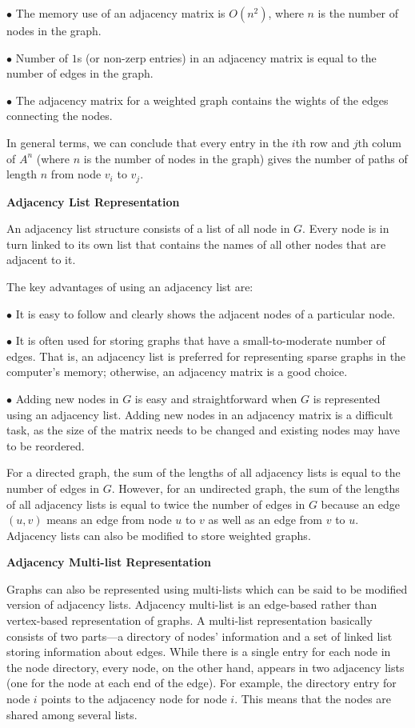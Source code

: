 \vskip 3mm
\qquad$\bullet$ The memory use of an adjacency matrix is $O(n^2)$, where $n$ is the number of nodes in the graph.

\vskip 3mm
\qquad$\bullet$ Number of $1$s (or non-zerp entries) in an adjacency matrix is equal to the number of edges in the graph.

\vskip 3mm
\qquad$\bullet$ The adjacency matrix for a weighted graph contains the wights of the edges connecting the nodes.

\vskip 1mm
In general terms, we can conclude that every entry in the $i$th row and $j$th colum of $A^n$ (where $n$ is the number of nodes in the graph) gives the number of paths of length $n$ from node $v_i$ to $v_j$.

\filbreak
\vskip 1cm
{\bf Adjacency List Representation}

\vskip 1mm
An adjacency list structure consists of a list of all node in $G$. Every node is in turn linked to its own list that contains the names of all other nodes that are adjacent to it.

\vskip 2mm
The key advantages of using an adjacency list are:

\vskip 3mm
\qquad$\bullet$ It is easy to follow and clearly shows the adjacent nodes of a particular node.

\vskip 3mm
\qquad$\bullet$ It is often used for storing graphs that have a small-to-moderate number of edges. That is, an adjacency list is preferred for representing sparse graphs in the computer's memory; otherwise, an adjacency matrix is a good choice.

\vskip 3mm
\qquad$\bullet$ Adding new nodes in $G$ is easy and straightforward when $G$ is represented using an adjacency list. Adding new nodes in an adjacency matrix is a difficult task, as the size of the matrix needs to be changed and existing nodes may have to be reordered.

\vskip 1mm
For a directed graph, the sum of the lengths of all adjacency lists is equal to the number of edges in $G$. However, for an undirected graph, the sum of the lengths of all adjacency lists is equal to twice the number of edges in $G$ because an edge $(u,v)$ means an edge from node $u$ to $v$ as well as an edge from $v$ to $u$. Adjacency lists can also be modified to store weighted graphs.

\filbreak
\vskip 1cm
{\bf Adjacency Multi-list Representation}

\vskip 1mm
Graphs can also be represented using multi-lists which can be said to be modified version of adjacency lists. Adjacency multi-list is an edge-based rather than vertex-based representation of graphs. A multi-list representation basically consists of two parts---a directory of nodes' information and a set of linked list storing information about edges. While there is a single entry for each node in the node directory, every node, on the other hand, appears in two adjacency lists (one for the node at each end of the edge). For example, the directory entry for node $i$ points to the adjacency node for node $i$. This means that the nodes are shared among several lists.

